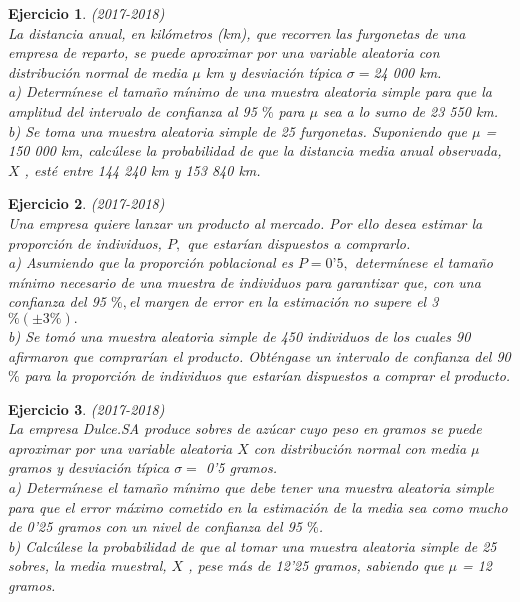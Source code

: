 \documentclass[12pt, a4paper]{amsart}
\newtheorem{ejer}{Ejercicio}
\begin{document}
\begin{ejer}\em (2017-2018)\\
La distancia anual, en kilómetros (km), que recorren las furgonetas de una empresa de reparto, se puede
aproximar por una variable aleatoria con distribución normal de media $\mu$ km y desviación típica  $\sigma =$24 000 km.\\
a) Determínese el tamaño mínimo de una muestra aleatoria simple para que la amplitud del intervalo de
confianza al 95 $\%$ para $\mu$ sea a lo sumo de 23 550 km.\\
b) Se toma una muestra aleatoria simple de 25 furgonetas. Suponiendo que $\mu$ = 150 000 km, calcúlese la
probabilidad de que la distancia media anual observada, $X$ , esté entre 144 240 km y 153 840 km.
\end{ejer}

\begin{ejer}\em (2017-2018)\\
Una empresa quiere lanzar un producto al mercado. Por ello desea estimar la proporción de individuos, $P,$ que
estarían dispuestos a comprarlo.\\
a) Asumiendo que la proporción poblacional es $P = 0’5,$ determínese el tamaño mínimo necesario de una
muestra de individuos para garantizar que, con una confianza del 95 $\%,$el margen de error en la estimación no
supere el 3 $\% ( \pm 3\%).$\\
b) Se tomó una muestra aleatoria simple de 450 individuos de los cuales 90 afirmaron que comprarían el
producto. Obténgase un intervalo de confianza del 90 $\%$ para la proporción de individuos que estarían dispuestos
a comprar el producto.
\end{ejer}

\begin{ejer}\em (2017-2018)\\
La empresa Dulce.SA produce sobres de azúcar cuyo peso en gramos se puede aproximar por una variable
aleatoria $X$ con distribución normal con media $\mu$ gramos y desviación típica  $\sigma =$ 0’5 gramos.\\
a) Determínese el tamaño mínimo que debe tener una muestra aleatoria simple para que el error máximo
cometido en la estimación de la media sea como mucho de 0’25 gramos con un nivel de confianza del 95 $\%$.\\ 
b) Calcúlese la probabilidad de que al tomar una muestra aleatoria simple de 25 sobres, la media muestral, $X$ ,
pese más de 12’25 gramos, sabiendo que $\mu$ = 12 gramos.
\end{ejer}
\end{document}
